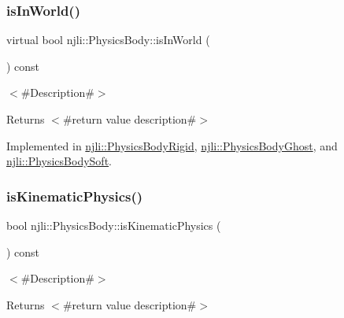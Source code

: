 \subsubsection{\texorpdfstring{is\+In\+World()}{isInWorld()}}
{\footnotesize\ttfamily virtual bool njli\+::\+Physics\+Body\+::is\+In\+World (\begin{DoxyParamCaption}{ }\end{DoxyParamCaption}) const\hspace{0.3cm}{\ttfamily [pure virtual]}}

$<$\#\+Description\#$>$

\begin{DoxyReturn}{Returns}
$<$\#return value description\#$>$ 
\end{DoxyReturn}


Implemented in \mbox{\hyperlink{classnjli_1_1_physics_body_rigid_a0679c29d4447ee758cb84234731dfbdd}{njli\+::\+Physics\+Body\+Rigid}}, \mbox{\hyperlink{classnjli_1_1_physics_body_ghost_a6b131b8407733cc046c4c8fa38b35055}{njli\+::\+Physics\+Body\+Ghost}}, and \mbox{\hyperlink{classnjli_1_1_physics_body_soft_a22d6c5a0a3572feb0a8888e54b2c0e9a}{njli\+::\+Physics\+Body\+Soft}}.

\mbox{\label{classnjli_1_1_physics_body_a00c42708cf7cebd2c287b6caae77b589}} 
\subsubsection{\texorpdfstring{is\+Kinematic\+Physics()}{isKinematicPhysics()}}
{\footnotesize\ttfamily bool njli\+::\+Physics\+Body\+::is\+Kinematic\+Physics (\begin{DoxyParamCaption}{ }\end{DoxyParamCaption}) const}

$<$\#\+Description\#$>$

\begin{DoxyReturn}{Returns}
$<$\#return value description\#$>$ 
\end{DoxyReturn}
\mbox{\label{classnjli_1_1_physics_body_a5aeab5201a9d85013340b2a1fb8af7e3}} 
